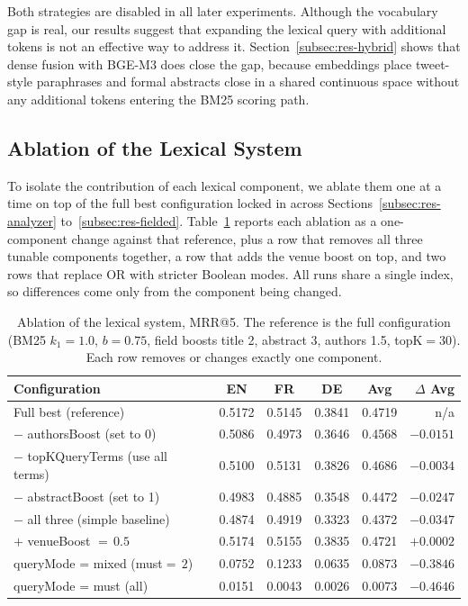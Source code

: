 Both strategies are disabled in all later experiments. Although the vocabulary gap is real, our results suggest that expanding the lexical query with additional tokens is not an effective way to address it. Section~\ref{subsec:res-hybrid} shows that dense fusion with BGE-M3 does close the gap, because embeddings place tweet-style paraphrases and formal abstracts close in a shared continuous space without any additional tokens entering the BM25 scoring path.

\subsection{Ablation of the Lexical System}
\label{subsec:res-ablation}

To isolate the contribution of each lexical component, we ablate them one at a time on top of the full best configuration locked in across Sections~\ref{subsec:res-analyzer} to~\ref{subsec:res-fielded}. Table~\ref{tab:ablation} reports each ablation as a one-component change against that reference, plus a row that removes all three tunable components together, a row that adds the venue boost on top, and two rows that replace OR with stricter Boolean modes. All runs share a single index, so differences come only from the component being changed.

\begin{table}[!ht]
    \caption{Ablation of the lexical system, MRR@5. The reference is the full configuration (BM25 $k_1{=}1.0$, $b{=}0.75$, field boosts title 2, abstract 3, authors 1.5, topK${=}30$). Each row removes or changes exactly one component.}
    \label{tab:ablation}
    \centering
    \begin{tabular}{lccccr}
        \toprule
        Configuration & EN & FR & DE & Avg & $\Delta$ Avg \\
        \midrule
        Full best (reference)                    & 0.5172 & 0.5145 & 0.3841 & 0.4719 & n/a \\
        \midrule
        $-$ authorsBoost (set to 0)              & 0.5086 & 0.4973 & 0.3646 & 0.4568 & $-0.0151$ \\
        $-$ topKQueryTerms (use all terms)       & 0.5100 & 0.5131 & 0.3826 & 0.4686 & $-0.0034$ \\
        $-$ abstractBoost (set to 1)             & 0.4983 & 0.4885 & 0.3548 & 0.4472 & $-0.0247$ \\
        $-$ all three (simple baseline)          & 0.4874 & 0.4919 & 0.3323 & 0.4372 & $-0.0347$ \\
        \midrule
        $+$ venueBoost ${=}\,0.5$                & 0.5174 & 0.5155 & 0.3835 & 0.4721 & $+0.0002$ \\
        queryMode = mixed (must${=}\,2$)         & 0.0752 & 0.1233 & 0.0635 & 0.0873 & $-0.3846$ \\
        queryMode = must (all)                   & 0.0151 & 0.0043 & 0.0026 & 0.0073 & $-0.4646$ \\
        \bottomrule
    \end{tabular}
\end{table}

